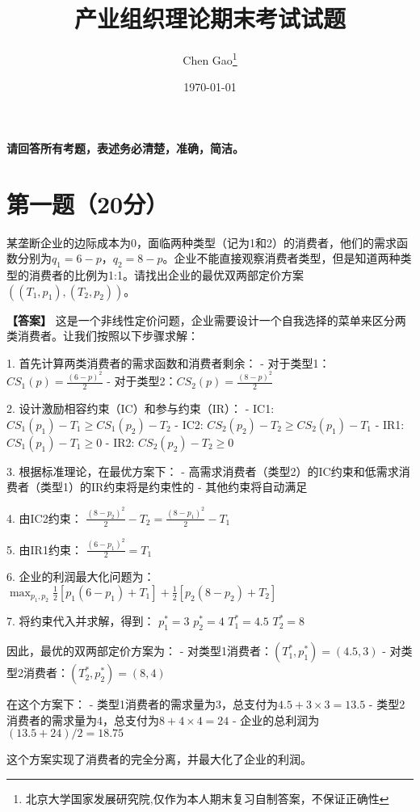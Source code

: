 \documentclass[12pt]{article}
\begin{document}
\title{产业组织理论期末考试试题}
\author{Chen Gao\thanks{北京大学国家发展研究院,仅作为本人期末复习自制答案，不保证正确性}}
\date{\today}
\maketitle

\medskip
\noindent\textbf{请回答所有考题，表述务必清楚，准确，简洁。}

\section*{第一题（20分）}
某垄断企业的边际成本为0，面临两种类型（记为1和2）的消费者，他们的需求函数分别为$q_1=6-p$，$q_2=8-p$。企业不能直接观察消费者类型，但是知道两种类型的消费者的比例为1:1。请找出企业的最优双两部定价方案$((T_1,p_1),(T_2,p_2))$。

\noindent\textbf{【答案】}
这是一个非线性定价问题，企业需要设计一个自我选择的菜单来区分两类消费者。让我们按照以下步骤求解：

1. 首先计算两类消费者的需求函数和消费者剩余：
   - 对于类型1：$CS_1(p) = \frac{(6-p)^2}{2}$
   - 对于类型2：$CS_2(p) = \frac{(8-p)^2}{2}$

2. 设计激励相容约束（IC）和参与约束（IR）：
   - IC1: $CS_1(p_1) - T_1 \geq CS_1(p_2) - T_2$
   - IC2: $CS_2(p_2) - T_2 \geq CS_2(p_1) - T_1$
   - IR1: $CS_1(p_1) - T_1 \geq 0$
   - IR2: $CS_2(p_2) - T_2 \geq 0$

3. 根据标准理论，在最优方案下：
   - 高需求消费者（类型2）的IC约束和低需求消费者（类型1）的IR约束将是约束性的
   - 其他约束将自动满足

4. 由IC2约束：
   $\frac{(8-p_2)^2}{2} - T_2 = \frac{(8-p_1)^2}{2} - T_1$

5. 由IR1约束：
   $\frac{(6-p_1)^2}{2} = T_1$

6. 企业的利润最大化问题为：
   $\max_{p_1,p_2} \frac{1}{2}[p_1(6-p_1) + T_1] + \frac{1}{2}[p_2(8-p_2) + T_2]$

7. 将约束代入并求解，得到：
   $p_1^* = 3$
   $p_2^* = 4$
   $T_1^* = 4.5$
   $T_2^* = 8$

因此，最优的双两部定价方案为：
- 对类型1消费者：$(T_1^*,p_1^*) = (4.5,3)$
- 对类型2消费者：$(T_2^*,p_2^*) = (8,4)$

在这个方案下：
- 类型1消费者的需求量为3，总支付为$4.5 + 3 \times 3 = 13.5$
- 类型2消费者的需求量为4，总支付为$8 + 4 \times 4 = 24$
- 企业的总利润为$(13.5 + 24)/2 = 18.75$

这个方案实现了消费者的完全分离，并最大化了企业的利润。
\end{document}
